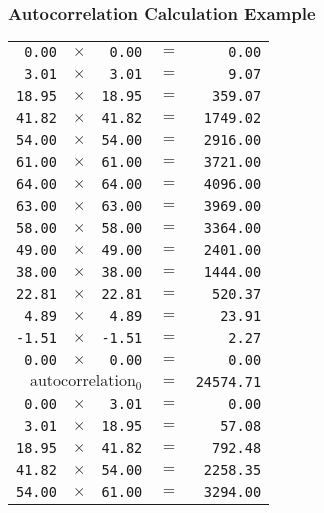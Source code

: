 {\begin{multicols}{2}
\subsubsection{Autocorrelation Calculation Example}
\begin{tabular}{rrrrr}
  \texttt{0.00} & $\times$ & \texttt{0.00} & $=$ & \texttt{0.00} \\
  \texttt{3.01} & $\times$ & \texttt{3.01} & $=$ & \texttt{9.07} \\
  \texttt{18.95} & $\times$ & \texttt{18.95} & $=$ & \texttt{359.07} \\
  \texttt{41.82} & $\times$ & \texttt{41.82} & $=$ & \texttt{1749.02} \\
  \texttt{54.00} & $\times$ & \texttt{54.00} & $=$ & \texttt{2916.00} \\
  \texttt{61.00} & $\times$ & \texttt{61.00} & $=$ & \texttt{3721.00} \\
  \texttt{64.00} & $\times$ & \texttt{64.00} & $=$ & \texttt{4096.00} \\
  \texttt{63.00} & $\times$ & \texttt{63.00} & $=$ & \texttt{3969.00} \\
  \texttt{58.00} & $\times$ & \texttt{58.00} & $=$ & \texttt{3364.00} \\
  \texttt{49.00} & $\times$ & \texttt{49.00} & $=$ & \texttt{2401.00} \\
  \texttt{38.00} & $\times$ & \texttt{38.00} & $=$ & \texttt{1444.00} \\
  \texttt{22.81} & $\times$ & \texttt{22.81} & $=$ & \texttt{520.37} \\
  \texttt{4.89} & $\times$ & \texttt{4.89} & $=$ & \texttt{23.91} \\
  \texttt{-1.51} & $\times$ & \texttt{-1.51} & $=$ & \texttt{2.27} \\
  \texttt{0.00} & $\times$ & \texttt{0.00} & $=$ & \texttt{0.00} \\
  \hline
  \multicolumn{3}{r}{$\text{autocorrelation}_0$} & $=$ & \texttt{24574.71} \\
  \hline
  \hline
  \texttt{0.00} & $\times$ & \texttt{3.01} & $=$ & \texttt{0.00} \\
  \texttt{3.01} & $\times$ & \texttt{18.95} & $=$ & \texttt{57.08} \\
  \texttt{18.95} & $\times$ & \texttt{41.82} & $=$ & \texttt{792.48} \\
  \texttt{41.82} & $\times$ & \texttt{54.00} & $=$ & \texttt{2258.35} \\
  \texttt{54.00} & $\times$ & \texttt{61.00} & $=$ & \texttt{3294.00} \\

\end{tabular}
\end{multicols}}
